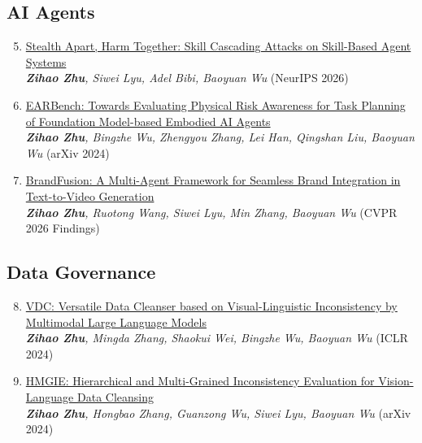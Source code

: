 \documentclass[11pt,a4paper,sans]{moderncv}
\newcommand{\darkred}[1]{\textcolor{harvardcrimson}{#1}}
\newcommand{\paperlink}[2]{\hypersetup{urlcolor=black}\href{#1}{#2}\hypersetup{urlcolor=blue}}
\begin{document}
\subsection{AI Agents}
    \begin{enumerate}[itemsep=2pt, topsep=2pt, parsep=0pt]
    \setcounter{enumi}{4}
    \item \paperlink{https://arxiv.org/abs/2609.30383}{Stealth Apart, Harm Together: Skill Cascading Attacks on Skill-Based Agent Systems}\\
    \textit{\textbf{Zihao Zhu}, Siwei Lyu, Adel Bibi, Baoyuan Wu} \darkred{(NeurIPS 2026)}

    \item \paperlink{https://arxiv.org/abs/2408.04449}{EARBench: Towards Evaluating Physical Risk Awareness for Task Planning of Foundation Model-based Embodied AI Agents}\\
    \textit{\textbf{Zihao Zhu}, Bingzhe Wu, Zhengyou Zhang, Lei Han, Qingshan Liu, Baoyuan Wu} \darkred{(arXiv 2024)}
    
    \item \paperlink{https://arxiv.org/pdf/2603.02816}{BrandFusion: A Multi-Agent Framework for Seamless Brand Integration in Text-to-Video Generation}\\
    \textit{\textbf{Zihao Zhu}, Ruotong Wang, Siwei Lyu, Min Zhang, Baoyuan Wu} \darkred{(CVPR 2026 Findings)}
    \end{enumerate}

\subsection{Data Governance}
    \begin{enumerate}[itemsep=2pt, topsep=2pt, parsep=0pt]
    \setcounter{enumi}{7}
    \item \paperlink{https://arxiv.org/abs/2309.16211}{VDC: Versatile Data Cleanser based on Visual-Linguistic Inconsistency by Multimodal Large Language Models}\\
    \textit{\textbf{Zihao Zhu}, Mingda Zhang, Shaokui Wei, Bingzhe Wu, Baoyuan Wu} \darkred{(ICLR 2024)}
    
    \item \paperlink{https://arxiv.org/pdf/2412.05685}{HMGIE: Hierarchical and Multi-Grained Inconsistency Evaluation for Vision-Language Data Cleansing}\\
    \textit{\textbf{Zihao Zhu}, Hongbao Zhang, Guanzong Wu, Siwei Lyu, Baoyuan Wu} \darkred{(arXiv 2024)}
    \end{enumerate}
\end{document}
